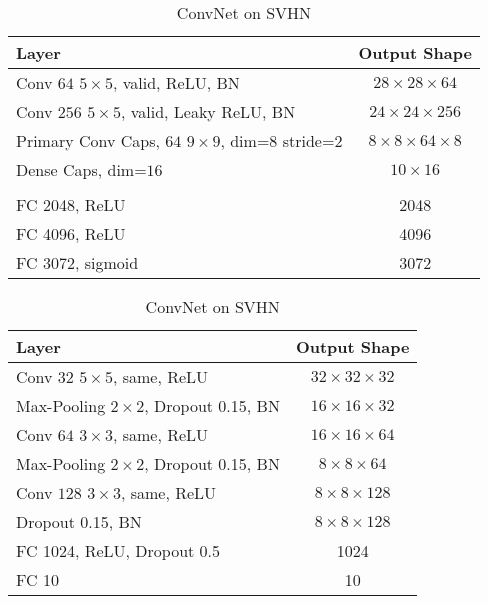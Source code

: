 \begin{table}
	\centering
	
	\begin{tabular}{lc}
		\toprule 
		Layer	& Output Shape \\ 
		\midrule 
		Conv $64$ $5\times5$, valid, ReLU, BN	&  $28\times28\times64$ \\ 
		\midrule 
		Conv $256$ $5\times5$, valid, Leaky ReLU, BN	&  $24\times24\times256$\\ 
		\midrule 
		Primary Conv Caps, $64$ $9\times9$, dim=$8$	stride=$2$ &  $8\times8\times64\times8$\\ 
		\midrule 
		Dense Caps, dim=$16$	&  $10\times16$\\ 
		\midrule
		& \\
		\midrule
		FC 2048, ReLU	& 2048 \\
		\midrule
		FC 4096, ReLU	& 4096 \\
		\midrule
		FC 3072, sigmoid	& 3072\\
		\bottomrule
	\end{tabular}
	\caption{CapsNet on SVHN}
	\label{tab:capsnet:svhn}
	
	\vspace{0.75cm}
	
	\begin{tabular}{lc}
		\toprule 
		Layer	&  Output Shape \\ 
		\midrule 
		Conv $32$ $5\times5$, same,	ReLU & $32\times32\times32$ \\ 
		\midrule 
		Max-Pooling $2\times2$, Dropout 0.15, BN	&  $16\times16\times32$ \\ 
		\midrule 
		Conv $64$ $3\times3$, same, ReLU	& $16\times16\times64$ \\ 
		\midrule 
		Max-Pooling $2\times2$, Dropout 0.15, BN	& $8\times8\times64$ \\
		\midrule
		Conv $128$ $3\times3$, same, ReLU	& $8\times8\times128$ \\
		\midrule
		Dropout 0.15, BN	& $8\times8\times128$ \\
		\midrule
		FC 1024, ReLU, Dropout 0.5 & 1024 \\
		\midrule
		FC 10 & 10\\
		\bottomrule
	\end{tabular}
	\caption{ConvNet on SVHN}
	\label{tab:convnet:svhn}
\end{table}



